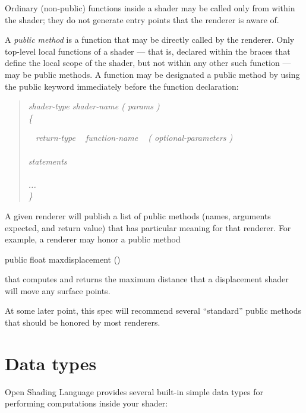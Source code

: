 \documentclass[11pt,letterpaper]{book}
\def\langname{Open Shading Language\xspace}
\begin{document}
Ordinary (non-public) functions inside a shader may be called only from
within the shader; they do not generate entry points that the renderer
is aware of.

A \emph{public method} is a function that may be directly called by the
renderer.  Only top-level local functions of a shader --- that is,
declared within the braces that define the local scope of the shader,
but not within any other such function --- may be public methods.  A
function may be designated a public method by using the {\cf public}
keyword immediately before the function declaration:

\begin{quote}
\em shader-type shader-name ( params ) \\
{\rm\cf \{}

 \em ~ return-type ~ function-name ~ {\rm \cf (}
optional-parameters {\rm \cf )} \\
\spc {\rm \cf \{ } \\
\spc\spc statements \\
\spc {\rm \cf \} } \\

\spc ...\\
{\rm\cf \}}
\end{quote}


\begin{annotate}
A given renderer will publish a list of public methods (names, arguments
expected, and return value) that has particular meaning for that
renderer.  For example, a renderer may honor a public method
\begin{code}
    public float maxdisplacement ()
\end{code}
\noindent that computes and returns the maximum distance 
that a displacement shader will move any surface points.

At some later point, this spec will recommend several ``standard''
public methods that should be honored by most renderers.
\end{annotate}

\chapter{Data types}
\label{chap:types}

\langname provides several built-in simple data types for performing
computations inside your shader:
\smallskip
\end{document}
